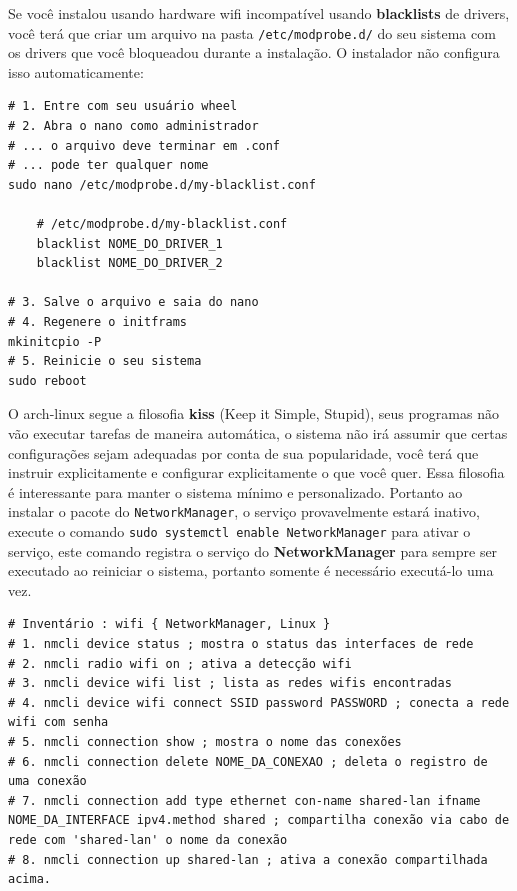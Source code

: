 \documentclass[12pt,a4paper]{article}
\begin{document}
\hspace{\baselineskip}

Se você instalou usando hardware wifi incompatível usando \textbf{blacklists} de drivers, você terá que criar um arquivo na pasta \texttt{/etc/modprobe.d/} do seu sistema com os drivers que você bloqueadou durante a instalação. O instalador não configura isso automaticamente: \\

\begin{lstlisting}
# 1. Entre com seu usuário wheel 
# 2. Abra o nano como administrador
# ... o arquivo deve terminar em .conf 
# ... pode ter qualquer nome 
sudo nano /etc/modprobe.d/my-blacklist.conf 

    # /etc/modprobe.d/my-blacklist.conf 
    blacklist NOME_DO_DRIVER_1
    blacklist NOME_DO_DRIVER_2

# 3. Salve o arquivo e saia do nano 
# 4. Regenere o initframs 
mkinitcpio -P 
# 5. Reinicie o seu sistema
sudo reboot
\end{lstlisting}

\vspace{\baselineskip}

O arch-linux segue a filosofia \textbf{kiss} (Keep it Simple, Stupid), seus programas não vão executar tarefas de maneira automática, o sistema não irá assumir que certas configurações sejam adequadas por conta de sua popularidade, você terá que instruir explicitamente e configurar explicitamente o que você quer. Essa filosofia é interessante para manter o sistema mínimo e personalizado. Portanto ao instalar o pacote do \texttt{NetworkManager}, o serviço provavelmente estará inativo, execute o comando \texttt{sudo systemctl enable NetworkManager} para ativar o serviço, este comando registra o serviço do \textbf{NetworkManager} para sempre ser executado ao reiniciar o sistema, portanto somente é necessário executá-lo uma vez. \\

\begin{lstlisting}
# Inventário : wifi { NetworkManager, Linux }
# 1. nmcli device status ; mostra o status das interfaces de rede 
# 2. nmcli radio wifi on ; ativa a detecção wifi 
# 3. nmcli device wifi list ; lista as redes wifis encontradas 
# 4. nmcli device wifi connect SSID password PASSWORD ; conecta a rede wifi com senha 
# 5. nmcli connection show ; mostra o nome das conexões 
# 6. nmcli connection delete NOME_DA_CONEXAO ; deleta o registro de uma conexão
# 7. nmcli connection add type ethernet con-name shared-lan ifname NOME_DA_INTERFACE ipv4.method shared ; compartilha conexão via cabo de rede com 'shared-lan' o nome da conexão 
# 8. nmcli connection up shared-lan ; ativa a conexão compartilhada acima.
\end{lstlisting}
\end{document}
